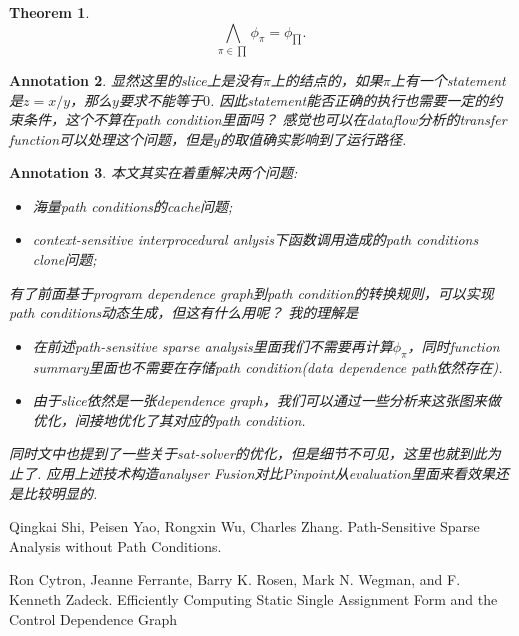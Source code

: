 \documentclass{article}
\newtheorem{theorem}{Theorem}[section]
\newtheorem{annotation}[theorem]{Annotation}
\begin{document}
\begin{theorem}
\rm 
$$
\bigwedge_{\pi \in {\prod}} \phi_\pi= \phi_{\prod}.
$$
\end{theorem}

\begin{annotation}
\rm 显然这里的slice上是没有$\pi$上的结点的，如果$\pi$上有一个statement是$z = x/y$，那么$y$要求不能等于$0$. 因此statement能否正确的执行也需要一定的约束条件，这个不算在path condition里面吗？ 感觉也可以在dataflow分析的transfer function可以处理这个问题，但是$y$的取值确实影响到了运行路径. 
\end{annotation}

\begin{annotation}
\rm 本文其实在着重解决两个问题:
\begin{itemize}
	\item 海量path conditions的cache问题;
	\item context-sensitive interprocedural anlysis下函数调用造成的path conditions clone问题;
\end{itemize}
有了前面基于program dependence graph到path condition的转换规则，可以实现path conditions动态生成，但这有什么用呢？ 我的理解是
\begin{itemize}
	\item 在前述path-sensitive sparse analysis里面我们不需要再计算$\phi_\pi$，同时function summary里面也不需要在存储path condition(data dependence path依然存在).  
	\item 由于slice依然是一张dependence graph，我们可以通过一些分析来这张图来做优化，间接地优化了其对应的path condition.  
\end{itemize}
同时文中也提到了一些关于sat-solver的优化，但是细节不可见，这里也就到此为止了. 应用上述技术构造analyser Fusion对比Pinpoint从evaluation里面来看效果还是比较明显的.
\end{annotation}


\begin{thebibliography}{9}
Qingkai Shi, Peisen Yao, Rongxin Wu, Charles Zhang. Path-Sensitive Sparse Analysis without Path Conditions.

Ron Cytron, Jeanne Ferrante, Barry K. Rosen, Mark N. Wegman, and F. Kenneth Zadeck. Efficiently Computing Static Single Assignment Form and the Control Dependence Graph
\end{thebibliography}
\end{document}
